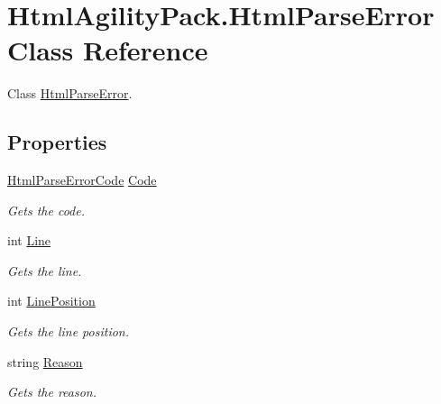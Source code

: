 \hypertarget{class_html_agility_pack_1_1_html_parse_error}{}\section{Html\+Agility\+Pack.\+Html\+Parse\+Error Class Reference}
\label{class_html_agility_pack_1_1_html_parse_error}


Class \hyperlink{class_html_agility_pack_1_1_html_parse_error}{Html\+Parse\+Error}.  


\subsection*{Properties}
\begin{DoxyCompactItemize}
\item 
\hyperlink{namespace_html_agility_pack_a73f43e39297685e4ddb8101f07585e45}{Html\+Parse\+Error\+Code} \hyperlink{class_html_agility_pack_1_1_html_parse_error_a68b06ae2e975f930dc9b512411b8535b}{Code}
\begin{DoxyCompactList}\small\item\em Gets the code. \end{DoxyCompactList}\item 
int \hyperlink{class_html_agility_pack_1_1_html_parse_error_a4868d0c19c5d2b1494705c520b7b93f8}{Line}
\begin{DoxyCompactList}\small\item\em Gets the line. \end{DoxyCompactList}\item 
int \hyperlink{class_html_agility_pack_1_1_html_parse_error_ad87338c4bf88e10577d695f08589d8f3}{Line\+Position}
\begin{DoxyCompactList}\small\item\em Gets the line position. \end{DoxyCompactList}\item 
string \hyperlink{class_html_agility_pack_1_1_html_parse_error_a1ec38712fb915eab35334f933c528a12}{Reason}
\begin{DoxyCompactList}\small\item\em Gets the reason. \end{DoxyCompactList}\item 

\end{DoxyCompactItemize}
